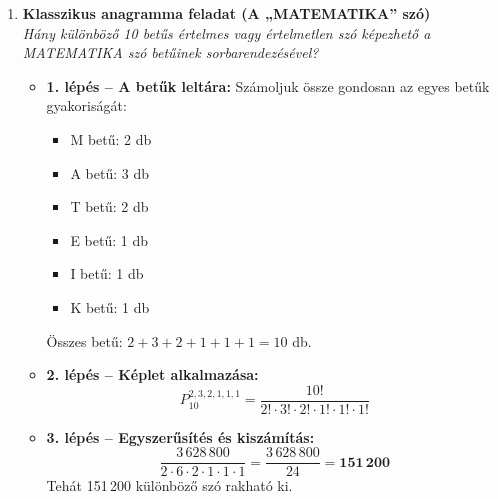 \documentclass[11pt, a4paper]{article}
\begin{document}
\begin{enumerate}[label=\arabic*., leftmargin=*]
    \item \textbf{Klasszikus anagramma feladat (A „MATEMATIKA” szó)}\\
    \textit{Hány különböző 10 betűs értelmes vagy értelmetlen szó képezhető a MATEMATIKA szó betűinek sorbarendezésével?}
    \begin{itemize}
        \item \textbf{1. lépés – A betűk leltára:} Számoljuk össze gondosan az egyes betűk gyakoriságát:
        \begin{itemize}
            \item M betű: 2 db
            \item A betű: 3 db
            \item T betű: 2 db
            \item E betű: 1 db
            \item I betű: 1 db
            \item K betű: 1 db
        \end{itemize}
        Összes betű: $2 + 3 + 2 + 1 + 1 + 1 = 10$ db.
        \item \textbf{2. lépés – Képlet alkalmazása:}
        \[
        P_{10}^{2, 3, 2, 1, 1, 1} = \frac{10!}{2! \cdot 3! \cdot 2! \cdot 1! \cdot 1! \cdot 1!}
        \]
        \item \textbf{3. lépés – Egyszerűsítés és kiszámítás:}
        \[
        \frac{3\,628\,800}{2 \cdot 6 \cdot 2 \cdot 1 \cdot 1 \cdot 1} = \frac{3\,628\,800}{24} = \mathbf{151\,200}
        \]
        Tehát 151\,200 különböző szó rakható ki.
    \end{itemize}

    \begin{center}
\end{center}
\end{enumerate}
\end{document}
